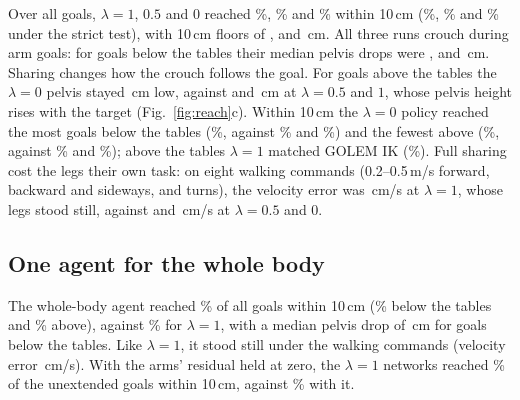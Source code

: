 Over all goals, $\lambda = 1$, $0.5$ and $0$ reached \%,
\% and \% within 10\,cm
(\%, \% and \% under the strict test),
with 10\,cm floors of ,  and \,cm.
All three runs crouch during arm goals: for goals below the tables their median pelvis drops were
,  and \,cm. Sharing changes
how the crouch follows the goal. For goals above the tables the $\lambda = 0$ pelvis stayed
\,cm low, against  and \,cm at
$\lambda = 0.5$ and $1$, whose pelvis height rises with the target (Fig.~\ref{fig:reach}c). Within 10\,cm the
$\lambda = 0$ policy reached the most goals below the tables (\%, against
\% and \%) and the fewest above
(\%, against \% and
\%); above the tables $\lambda = 1$ matched GOLEM IK
(\%). Full sharing cost the legs their own task: on eight walking
commands (0.2--0.5\,m/s forward, backward and sideways, and turns), the velocity error was
\,cm/s at $\lambda = 1$, whose legs stood still, against  and
\,cm/s at $\lambda = 0.5$ and $0$.

\subsection{One agent for the whole body}
\label{sec:wholebody}

The whole-body agent reached \% of all goals within 10\,cm
(\% below the tables and \% above),
against \% for $\lambda = 1$, with a median pelvis drop of
\,cm for goals below the tables. Like $\lambda = 1$, it stood still under the walking
commands (velocity error \,cm/s). With the arms' residual held at zero, the
$\lambda = 1$ networks reached \% of the unextended goals within 10\,cm,
against \% with it.

